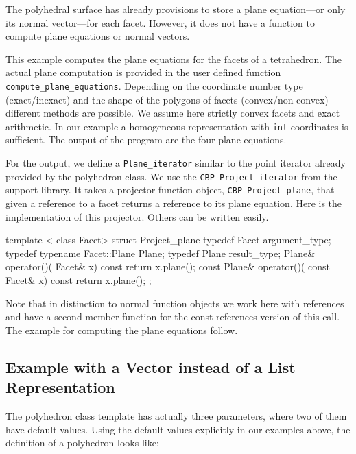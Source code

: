 The polyhedral surface has already provisions to store a plane
equation---or only its normal vector---for each facet. However, it 
does not have a function to compute plane equations or normal vectors. 

This example computes the plane equations for the facets of a
tetrahedron.  The actual plane computation is provided in the user
defined function {\tt compute\_plane\_equations}.  Depending on the
coordinate number type (exact/inexact) and the shape of the polygons
of facets (convex/non-convex) different methods are possible. We
assume here strictly convex facets and exact arithmetic. In our
example a homogeneous representation with {\tt int} coordinates is
sufficient.  The output of the program are the four plane
equations. 

For the output, we define a \texttt{Plane\_iterator} similar to the point
iterator already provided by the polyhedron class. We use the
\texttt{CBP\_Project\_iterator} from the support library. It takes a projector 
function object, \texttt{CBP\_Project\_plane}, that given a reference
to a facet returns a reference to its plane equation. Here is the
implementation of this projector. Others can be written easily.

\begin{ccExampleCode}
template < class Facet>
struct Project_plane {
    typedef Facet                  argument_type;
    typedef typename Facet::Plane  Plane;
    typedef Plane                  result_type;
    Plane&       operator()( Facet& x)       const { return x.plane(); }
    const Plane& operator()( const Facet& x) const { return x.plane(); }
};
\end{ccExampleCode}

Note that in distinction to normal function objects we work here with
references and have a second member function for the const-references
version of this call. The example for computing the plane equations
follow.


\subsection{Example with a Vector instead of a List Representation}
\label{sectionPolyVector}

The polyhedron class template has actually three parameters, where two
of them have default values. Using the default values explicitly in
our examples above, the definition of a polyhedron looks like:

